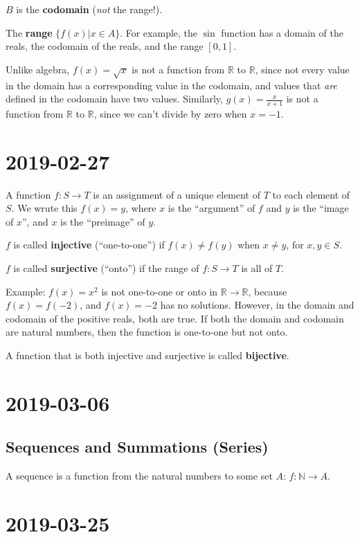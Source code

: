 \documentclass{article}
\theoremstyle{definition}
\begin{document}
$B$ is the \textbf{codomain} (\textit{not} the range!).

The \textbf{range} $\{f(x) | x \in A\}$. For example, the $\sin$ function
has a domain of the reals, the codomain of the reals, and the range $[0,1]$.

Unlike algebra, $f(x)=\sqrt{x}$ is not a function from $\mathbb{R}$ to
$\mathbb{R}$, since not every value in the domain has a corresponding value
in the codomain, and values that \textit{are} defined in the codomain have
two values. Similarly, $g(x) = \frac{x}{x+1}$ is not a function from
$\mathbb{R}$ to $\mathbb{R}$, since we can't divide by zero when $x=-1$.


\section{2019-02-27}

A function $f: S \to T$ is an assignment of a unique element of $T$ to each
element of $S$. We wrute this $f(x)=y$, where $x$ is the ``argument'' of $f$
and $y$ is the ``image of $x$'', and $x$ is the ``preimage'' of $y$.

$f$ is called \textbf{injective} (``one-to-one'') if $f(x) \neq f(y)$ when
$x \neq y$, for $x,y \in S$. 

$f$ is called \textbf{surjective} (``onto'') if the range of $f: S \to T$ is
all of $T$. 

Example: $f(x)=x^2$ is not one-to-one or onto in $\mathbb{R} \to \mathbb{R}$,
because $f(x)=f(-2)$, and $f(x)=-2$ has no solutions. However, in the domain
and codomain of the positive reals, both are true. If both the domain and 
codomain are natural numbers, then the function is one-to-one but not onto.

A function that is both injective and surjective is called \textbf{bijective}.



\section*{2019-03-06}

\subsection*{Sequences and Summations (Series)}

A sequence is a function from the natural numbers to some set $A$: $f: \mathbb{N} \to A$.

\section*{2019-03-25}
\end{document}
